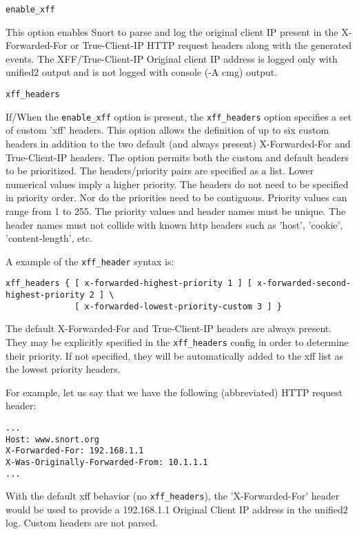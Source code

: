\documentclass[english]{report}
\newcounter{slistnum}
\newenvironment{slist}
{ \begin{list}{ {\bf \arabic{slistnum}.} }{\usecounter{slistnum} } }
{ \end{list} }
\begin{document}
\begin{slist}
\item \texttt{enable\_xff}

This option enables Snort to parse and log the original client IP present in the
X-Forwarded-For or True-Client-IP HTTP request headers along with the generated
events. The XFF/True-Client-IP Original client IP address is logged only with
unified2 output and is not logged with console (-A cmg) output.

\item \texttt{xff\_headers}

If/When the \texttt{enable\_xff} option is present, the \texttt{xff\_headers} option specifies a set of custom 'xff'
headers.  This option allows the definition of up to six custom headers in addition to the
two default (and always present) X-Forwarded-For and True-Client-IP headers.  The option
permits both the custom and default headers to be prioritized.  The headers/priority pairs
are specified as a list.  Lower numerical values imply a higher priority.  The headers do
not need to be specified in priority order.  Nor do the priorities need to be contiguous.
Priority values can range from 1 to 255.  The priority values and header names must be unique.
The header names must not collide with known http headers such as 'host', 'cookie',
'content-length', etc.

A example of the \texttt{xff\_header} syntax is:
\begin{verbatim}
xff_headers { [ x-forwarded-highest-priority 1 ] [ x-forwarded-second-highest-priority 2 ] \
              [ x-forwarded-lowest-priority-custom 3 ] }
\end{verbatim}

The default X-Forwarded-For and True-Client-IP headers are always present.  They may be explicitly
specified in the \texttt{xff\_headers} config in order to determine their priority.  If not specified, they
will be automatically added to the xff list as the lowest priority headers.

For example, let us say that we have the following (abbreviated) HTTP request header:

\begin{verbatim}
...
Host: www.snort.org
X-Forwarded-For: 192.168.1.1
X-Was-Originally-Forwarded-From: 10.1.1.1
...
\end{verbatim}
 
With the default xff behavior (no \texttt{xff\_headers}), the 'X-Forwarded-For' header would be used to
provide a 192.168.1.1 Original Client IP address in the unified2 log.  Custom headers are not
parsed.


\end{slist}
\end{document}
